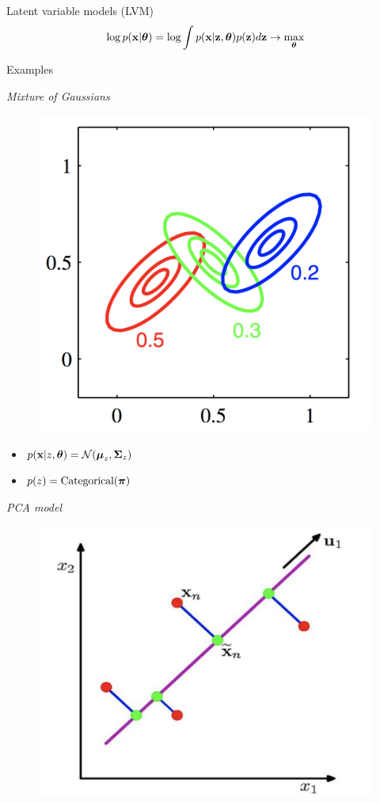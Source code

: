 \documentclass{beamer}
\begin{document}
\begin{frame}{Latent variable models (LVM)}
	\[
	\log p(\mathbf{x} | \boldsymbol{\theta}) = \log \int p(\mathbf{x} | \mathbf{z}, \boldsymbol{\theta}) p(\mathbf{z}) d\mathbf{z} \rightarrow \max_{\boldsymbol{\theta}}
	\]
	\vspace{-0.6cm}
	\begin{block}{Examples}
		\begin{minipage}[t]{0.45\columnwidth}
			\textit{Mixture of Gaussians} \\
			\vspace{-0.5cm}
			\begin{figure}
				\centering
				\includegraphics[width=0.75\linewidth]{figs/mixture_of_gaussians}
			\end{figure}
			\vspace{-0.5cm}
			\begin{itemize}
				\item $p(\mathbf{x} | z, \boldsymbol{\theta}) = \mathcal{N}(\boldsymbol{\mu}_z, \boldsymbol{\Sigma}_z)$
				\item $p(z) = \text{Categorical}(\boldsymbol{\pi})$
			\end{itemize}
		\end{minipage}%
		\begin{minipage}[t]{0.53\columnwidth}
			\textit{PCA model} \\
			\vspace{-0.5cm}
			\begin{figure}
				\centering
				\includegraphics[width=.7\linewidth]{figs/pca}

\end{figure}
\end{minipage}
\end{block}
\end{frame}
\end{document}
